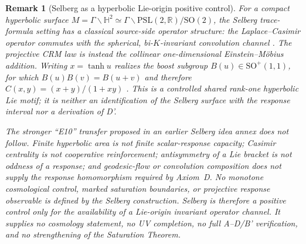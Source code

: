 \documentclass[aps,prd,twocolumn,superscriptaddress,nofootinbib]{revtex4-2}
\newtheorem{remark}{Remark}
\begin{document}
\begin{remark}[Selberg as a hyperbolic Lie-origin positive control]
For a compact hyperbolic surface $M=\Gamma\backslash\mathbb{H}^2\simeq\Gamma\backslash\mathrm{PSL}(2,\mathbb{R})/\mathrm{SO}(2)$, the Selberg trace-formula setting has a classical source-side operator structure: the Laplace--Casimir operator commutes with the spherical, bi-$K$-invariant convolution channel \cite{Selberg1956}. The projective CRM law is instead the collinear one-dimensional Einstein--Möbius addition. Writing $x=\tanh u$ realizes the boost subgroup $B(u)\in\mathrm{SO}^{+}(1,1)$, for which $B(u)B(v)=B(u+v)$ and therefore $C(x,y)=(x+y)/(1+xy)$ \cite{Ungar2007}. This is a controlled shared rank-one hyperbolic Lie motif; it is neither an identification of the Selberg surface with the response interval nor a derivation of D'.

The stronger ``E10'' transfer proposed in an earlier Selberg idea annex does not follow. Finite hyperbolic area is not finite scalar-response capacity; Casimir centrality is not cooperative reinforcement; antisymmetry of a Lie bracket is not oddness of a response; and geodesic-flow or convolution composition does not supply the response homomorphism required by Axiom~D. No monotone cosmological control, marked saturation boundaries, or projective response observable is defined by the Selberg construction. Selberg is therefore a positive control only for the availability of a Lie-origin invariant operator channel. It supplies no cosmology statement, no UV completion, no full A--D/B' verification, and no strengthening of the Saturation Theorem.
\end{remark}
\end{document}
